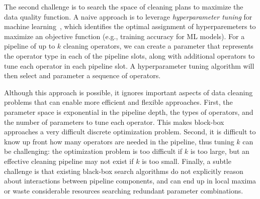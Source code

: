 The second challenge is to search the space of cleaning plans to maximize the data quality function.  A naive approach is to leverage \emph{hyperparameter tuning} for machine learning~\cite{li2017hyperband, sparks2017keystoneml, baylor2017tfx, golovin2017google, liaw2018tune}, which identifies the optimal assignment of hyperparemeters to maximize an objective function (e.g., training accuracy for ML models).   For a pipeline of up to $k$ cleaning operators, we can create a parameter that represents the operator type in each of the pipeline slots, along with additional operators to tune each operator in each pipeline slot.  A hyperparameter tuning algorithm will then select and parameter a sequence of operators.

Although this approach is possible, it ignores important aspects of data cleaning problems that can enable more efficient and flexible approaches.  First, the parameter space is exponential in the pipeline depth, the types of operators, and the number of parameters to tune each operator.   This makes block-box approaches a very difficult discrete optimization problem.   Second, it is difficult to know up front how many operators are needed in the pipeline, thus tuning $k$ can be challenging: the optimization problem is too difficult if $k$ is too large, but an effective cleaning pipeline may not exist if $k$ is too small.  Finally, a subtle challenge is that existing black-box search algorithms do not explicitly reason about interactions between pipeline components, and can end up in local maxima or waste considerable resources searching redundant parameter combinations. %




